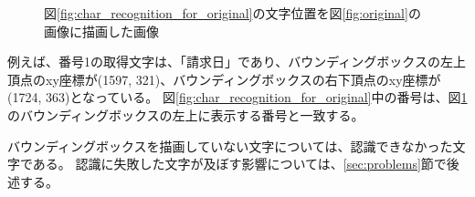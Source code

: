 \begin{figure}[tp]
    \begin{center}
        \caption{図\ref{fig:char_recognition_for_original}の文字位置を図\ref{fig:original}の画像に描画した画像}
        \label{fig:bbox_recognition_for_original}
    \end{center}
\end{figure}
例えば、番号1の取得文字は、「請求日」であり、バウンディングボックスの左上頂点のxy座標が(1597, 321)、バウンディングボックスの右下頂点のxy座標が(1724, 363)となっている。
図\ref{fig:char_recognition_for_original}中の番号は、図\ref{fig:bbox_recognition_for_original}のバウンディングボックスの左上に表示する番号と一致する。

バウンディングボックスを描画していない文字については、認識できなかった文字である。
認識に失敗した文字が及ぼす影響については、\ref{sec:problems}節で後述する。

